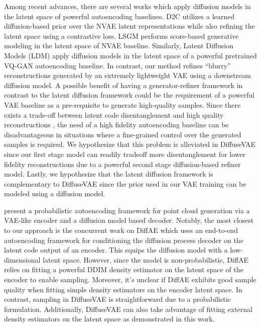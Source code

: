 \documentclass[10pt]{article} \usepackage[accepted]{tmlr}
\begin{document}
Among recent advances, there are several works which apply diffusion models in the latent space of powerful autoencoding baselines. D2C \citep{sinha2021d2c} utilizes a learned diffusion-based prior over the NVAE \citep{vahdat2021nvae} latent representations while also refining the latent space using a contrastive loss. LSGM \citep{vahdat2021scorebased} performs score-based generative modeling in the latent space of NVAE baseline. Similarly, Latent Diffusion Models (LDM) \citep{rombach2021highresolution} apply diffusion models in the latent space of a powerful pretrained VQ-GAN \citep{https://doi.org/10.48550/arxiv.2012.09841} autoencoding baseline. In contrast, our method refines “blurry” reconstructions generated by an extremely lightweight VAE using a downstream diffusion model. A possible benefit of having a generator-refiner framework in contrast to the latent diffusion framework could be the requirement of a powerful VAE baseline as a pre-requisite to generate high-quality samples. Since there exists a trade-off between latent code disentanglement and high quality reconstructions \citep{Higgins2017betaVAELB}, the need of a high fidelity autoencoding baseline can be disadvantageous in situations where a fine-grained control over the generated samples is required. We hypothesize that this problem is alleviated in DiffuseVAE since our first stage model can readily tradeoff more disentanglement for lower fidelity reconstructions due to a powerful second stage diffusion-based refiner model. Lastly, we hypothesize that the latent diffusion framework is complementary to DiffuseVAE since the prior used in our VAE training can be modeled using a diffusion model.

\citep{luo2021diffusion} present a probabilistic autoencoding framework for point cloud generation via a VAE-like encoder and a diffusion model based decoder. Notably, the most closest to our approach is the concurrent work on DiffAE \citep{preechakul2021diffusion} which uses an end-to-end autoencoding framework for conditioning the diffusion process decoder on the latent code output of an encoder. This equips the diffusion model with a low-dimensional latent space. However, since the model is non-probabilistic, DiffAE relies on fitting a powerful DDIM density estimator on the latent space of the encoder to enable sampling. Moreover, it's unclear if DiffAE exhibits good sample quality when fitting simple density estimators on the encoder latent space. In contrast, sampling in DiffuseVAE is straightforward due to a probabilistic formulation. Additionally, DiffuseVAE can also take advantage of fitting external density estimators on the latent space as demonstrated in this work.
\end{document}
